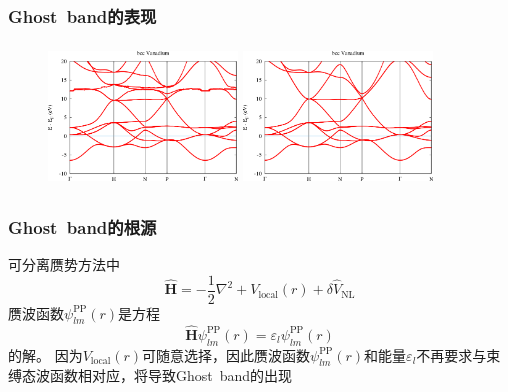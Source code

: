 \frame
{
	\frametitle{\textrm{Ghost~band}的表现}
	\fontsize{9.2pt}{4.2pt}
\begin{figure}[h!]
\centering
\vspace*{-0.10in}
\includegraphics[height=1.50in,width=1.98in,viewport=0 0 450 320,clip]{Figures/Ghostband-Vanadium-1.png}
\includegraphics[height=1.50in,width=1.98in,viewport=0 0 450 320,clip]{Figures/Ghostband-Vanadium-4.png}
\caption{\fontsize{7.2pt}{4.2pt}}%
\label{Ghost-band}
\end{figure}
}

\frame
{
	\frametitle{\textrm{Ghost~band}的根源}
	可分离赝势方法中
	\begin{displaymath}
		\hat{\mathbf{H}}=-\dfrac12\nabla^2+V_{\mathrm{local}}(r)+\delta\hat{V}_{\mathrm{NL}}
	\end{displaymath}
	赝波函数$\psi_{lm}^{\mathrm{PP}}(r)$是方程
	\begin{displaymath}
		\hat{\mathbf{H}}\psi_{lm}^{\mathrm{PP}}(r)=\varepsilon_l\psi_{lm}^{\mathrm{PP}}(r)
	\end{displaymath}
	的解。
\vskip 15pt
	因为$V_{\mathrm{local}}(r)$可随意选择，因此赝波函数$\psi_{lm}^{\mathrm{PP}}(r)$和能量$\varepsilon_l$不再要求与束缚态波函数相对应，将导致\textrm{Ghost~band}的出现
}

